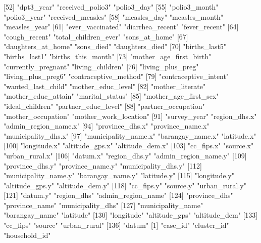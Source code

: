  [52] "dpt3_year"                 "received_polio3"           "polio3_day"               
 [55] "polio3_month"              "polio3_year"               "received_measles"         
 [58] "measles_day"               "measles_month"             "measles_year"             
 [61] "ever_vaccinated"           "diarrhea_recent"           "fever_recent"             
 [64] "cough_recent"              "total_children_ever"       "sons_at_home"             
 [67] "daughters_at_home"         "sons_died"                 "daughters_died"           
 [70] "births_last5"              "births_last1"              "births_this_month"        
 [73] "mother_age_first_birth"    "currently_pregnant"        "living_children"          
 [76] "living_plus_preg"          "living_plus_preg6"         "contraceptive_method"     
 [79] "contraceptive_intent"      "wanted_last_child"         "mother_educ_level"        
 [82] "mother_literate"           "mother_educ_attain"        "marital_status"           
 [85] "mother_age_first_sex"      "ideal_children"            "partner_educ_level"       
 [88] "partner_occupation"        "mother_occupation"         "mother_work_location"     
 [91] "survey_year"               "region_dhs.x"              "admin_region_name.x"      
 [94] "province_dhs.x"            "province_name.x"           "municipality_dhs.x"       
 [97] "municipality_name.x"       "barangay_name.x"           "latitude.x"               
[100] "longitude.x"               "altitude_gps.x"            "altitude_dem.x"           
[103] "cc_fips.x"                 "source.x"                  "urban_rural.x"            
[106] "datum.x"                   "region_dhs.y"              "admin_region_name.y"      
[109] "province_dhs.y"            "province_name.y"           "municipality_dhs.y"       
[112] "municipality_name.y"       "barangay_name.y"           "latitude.y"               
[115] "longitude.y"               "altitude_gps.y"            "altitude_dem.y"           
[118] "cc_fips.y"                 "source.y"                  "urban_rural.y"            
[121] "datum.y"                   "region_dhs"                "admin_region_name"        
[124] "province_dhs"              "province_name"             "municipality_dhs"         
[127] "municipality_name"         "barangay_name"             "latitude"                 
[130] "longitude"                 "altitude_gps"              "altitude_dem"             
[133] "cc_fips"                   "source"                    "urban_rural"              
[136] "datum"                    
  [1] "case_id"                   "cluster_id"                "household_id"             
